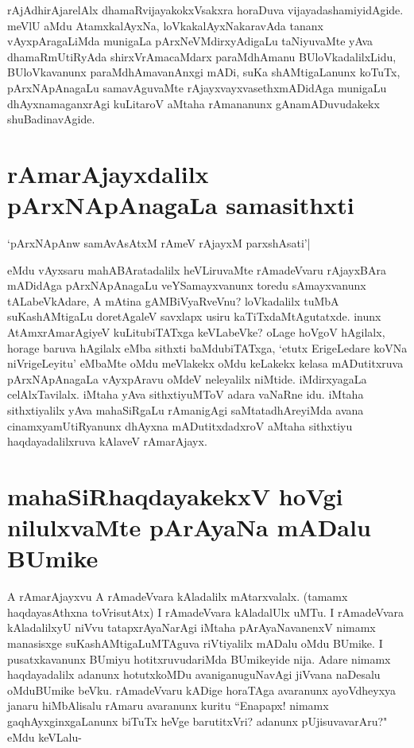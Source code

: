 rAjAdhirAjarelAlx dhamaRvijayakokxVsakxra horaDuva vijayadashamiyidAgide. meVlU aMdu AtamxkalAyxNa, loVkakalAyxNakaravAda tananx vAyxpAragaLiMda munigaLa pArxNeVMdirxyAdigaLu taNiyuvaMte yAva dhamaRmUtiRyAda shirxVrAmacaMdarx paraMdhAmanu BUloVkadalilxLidu, BUloVkavanunx paraMdhAmavanAnxgi mADi, suKa shAMtigaLanunx koTuTx, pArxNApAnagaLu samavAguvaMte rAjayxvayxvasethxmADidAga munigaLu dhAyxnamaganxrAgi kuLitaroV aMtaha rAmananunx gAnamADuvudakekx shuBadinavAgide. 

\section*{rAmarAjayxdalilx pArxNApAnagaLa samasithxti} 

\begin{shloka} 
`pArxNApAnw samAvAsAtxM rAmeV rAjayxM parxshAsati'|\label{161}
\end{shloka} 

eMdu vAyxsaru mahABAratadalilx heVLiruvaMte rAmadeVvaru rAjayxBAra mADidAga pArxNApAnagaLu veYSamayxvanunx toredu sAmayxvanunx tALabeVkAdare, A mAtina gAMBiVyaRveVnu? loVkadalilx tuMbA suKashAMtigaLu doretAgaleV savxlapx usiru kaTiTxdaMtAgutatxde. inunx AtAmxrAmarAgiyeV kuLitubiTATxga keVLabeVke? oLage hoVgoV hAgilalx, horage baruva hAgilalx eMba sithxti baMdubiTATxga, `etutx ErigeLedare koVNa niVrigeLeyitu' eMbaMte oMdu meVlakekx oMdu keLakekx kelasa mADutitxruva pArxNApAnagaLa vAyxpAravu oMdeV neleyalilx niMtide. iMdirxyagaLa celAlxTavilalx. iMtaha yAva sithxtiyuMToV adara vaNaRne idu. iMtaha sithxtiyalilx yAva mahaSiRgaLu rAmanigAgi saMtatadhAreyiMda avana cinamxyamUtiRyanunx dhAyxna mADutitxdadxroV aMtaha sithxtiyu haqdayadalilxruva kAlaveV rAmarAjayx. 

\section*{mahaSiRhaqdayakekxV hoVgi nilulxvaMte pArAyaNa mADalu BUmike} 

A rAmarAjayxvu A rAmadeVvara kAladalilx mAtarxvalalx. (tamamx haqdayasAthxna toVrisutAtx) I rAmadeVvara kAladalUlx uMTu. I rAmadeVvara kAladalilxyU niVvu tatapxrAyaNarAgi iMtaha pArAyaNavanenxV nimamx manasisxge suKashAMtigaLuMTAguva riVtiyalilx mADalu oMdu BUmike. I pusatxkavanunx BUmiyu hotitxruvudariMda BUmikeyide nija. Adare nimamx haqdayadalilx adanunx hotutxkoMDu avaniganuguNavAgi jiVvana naDesalu oMduBUmike beVku. rAmadeVvaru kADige horaTAga avaranunx ayoVdheyxya janaru hiMbAlisalu rAmaru avaranunx kuritu ``Enapapx! nimamx gaqhAyxginxgaLanunx biTuTx heVge barutitxVri? adanunx pUjisuvavarAru?" eMdu keVLalu- 

